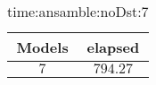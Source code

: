 \begin{table}[!ht]
	\centering
	\begin{tabular}{|c|c|}
		\hline
		Models & elapsed \\ \hline
		$7$ & $794.27$ \\ \hline
	\end{tabular}
	\caption{time:ansamble:noDst:7}
	\label{tab:time:ansamble:noDst:7}
\end{table}
